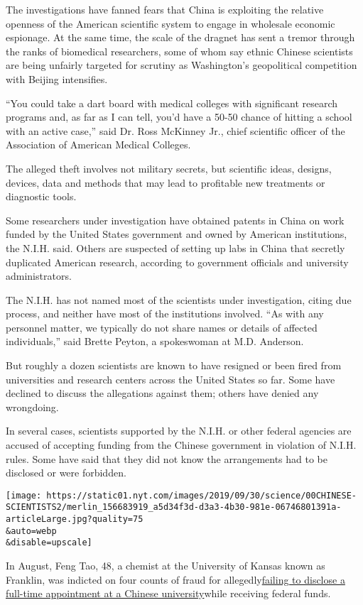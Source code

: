 The investigations have fanned fears that China is exploiting the
relative openness of the American scientific system to engage in
wholesale economic espionage. At the same time, the scale of the dragnet
has sent a tremor through the ranks of biomedical researchers, some of
whom say ethnic Chinese scientists are being unfairly targeted for
scrutiny as Washington's geopolitical competition with Beijing
intensifies.

``You could take a dart board with medical colleges with significant
research programs and, as far as I can tell, you'd have a 50-50 chance
of hitting a school with an active case,'' said Dr. Ross McKinney Jr.,
chief scientific officer of the Association of American Medical
Colleges.

The alleged theft involves not military secrets, but scientific ideas,
designs, devices, data and methods that may lead to profitable new
treatments or diagnostic tools.

Some researchers under investigation have obtained patents in China on
work funded by the United States government and owned by American
institutions, the N.I.H. said. Others are suspected of setting up labs
in China that secretly duplicated American research, according to
government officials and university administrators.

The N.I.H. has not named most of the scientists under investigation,
citing due process, and neither have most of the institutions involved.
``As with any personnel matter, we typically do not share names or
details of affected individuals,'' said Brette Peyton, a spokeswoman at
M.D. Anderson.

But roughly a dozen scientists are known to have resigned or been fired
from universities and research centers across the United States so far.
Some have declined to discuss the allegations against them; others have
denied any wrongdoing.

In several cases, scientists supported by the N.I.H. or other federal
agencies are accused of accepting funding from the Chinese government in
violation of N.I.H. rules. Some have said that they did not know the
arrangements had to be disclosed or were forbidden.

\texttt{[image: https://static01.nyt.com/images/2019/09/30/science/00CHINESE-SCIENTISTS2/merlin\_156683919\_a5d34f3d-d3a3-4b30-981e-06746801391a-articleLarge.jpg?quality=75\\\&auto=webp\\\&disable=upscale]}

In August, Feng Tao, 48, a chemist at the University of Kansas known as
Franklin, was indicted on four counts of fraud for
allegedly\href{https://www.insidehighered.com/news/2019/08/23/kansas-professor-indicted-allegedly-failing-disclose-appointment-chinese-university}{failing
to disclose a full-time appointment at a Chinese university}while
receiving federal funds.

